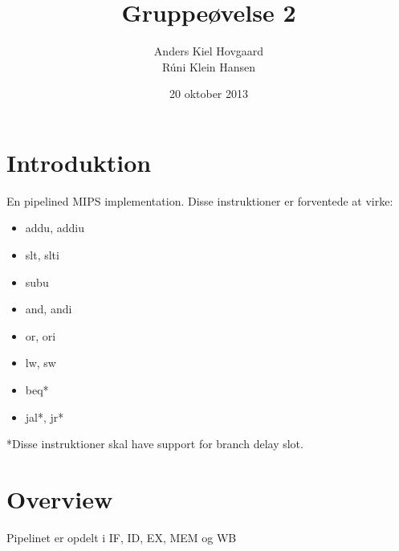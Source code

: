 \documentclass[12pt,a4paper,danish]{article}
\begin{document}
\title{Gruppeøvelse 2}
\author{Anders Kiel Hovgaard\\Rúni Klein Hansen}
\date{20 oktober 2013}
\maketitle

\section{Introduktion}
En pipelined MIPS implementation. Disse instruktioner er forventede at virke:
\begin{itemize}
  \item addu, addiu
  \item slt, slti
  \item subu
  \item and, andi
  \item or, ori
  \item lw, sw
  \item beq*
  \item jal*, jr*
\end{itemize}
*Disse instruktioner skal have support for branch delay slot.

\section{Overview}
Pipelinet er opdelt i IF, ID, EX, MEM og WB
\end{document}
